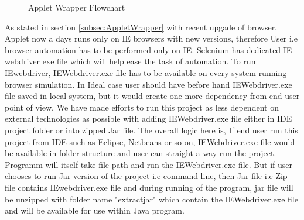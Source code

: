\documentclass[article,type=msc,colorback,accentcolor=tud9c,twoside,11pt]{tudthesis}
\begin{document}
\begin{center}
\begin{figure}[h]
  \caption{Applet Wrapper Flowchart} 
  \label{fig:AppletwrapperAlgorithm}
\end{figure}
\end{center}
As stated in section \ref{subsec:AppletWrapper} with recent upgade of browser, Applet now a days runs only on IE browsers with new versions, therefore User i.e browser automation has to be performed only on IE. Selenium has dedicated IE webdriver  exe file which will help ease the task of automation. To run IEwebdriver, IEWebdriver.exe file has to be available on every system running browser simulation. In Ideal case user should have before hand IEWebdriver.exe file saved in local system, but it would create one more dependency from end user point of view. We have made efforts to run this project as less dependent on external technologies as possible with adding IEWebdriver.exe file either in IDE project folder or into zipped Jar file. The overall logic here is, If end user run this project from IDE such as Eclipse, Netbeans or so on, IEWebdriver.exe file would be available in folder structure and user can straight a way run the project. Programm will itself take file path and run the IEWebdriver.exe file. But if user chooses to run Jar version of the project i.e command line, then Jar file i.e Zip file contains IEwebdriver.exe file and during running of the program, jar file will be unzipped with folder name "extractjar" which contain the IEWebdriver.exe file and will be available for use within Java program.
\end{document}

